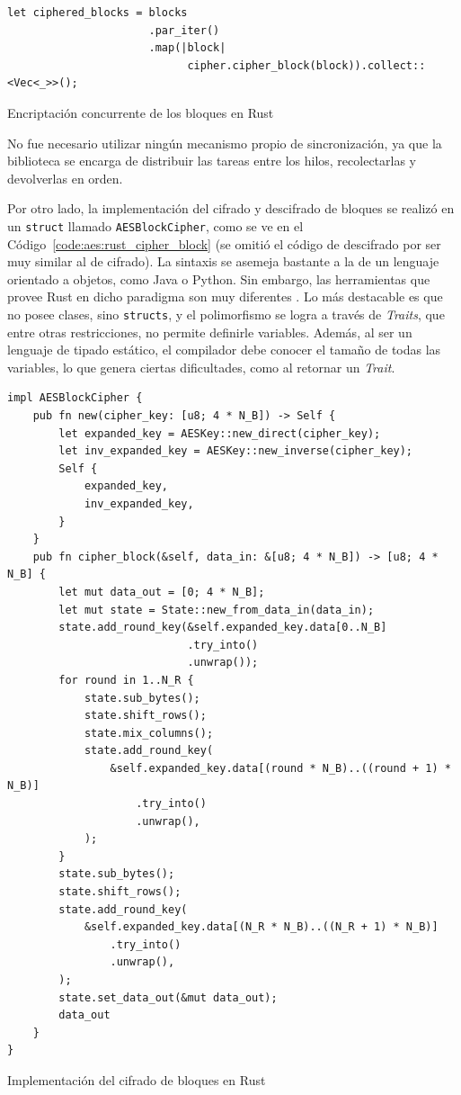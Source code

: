 \documentclass[11pt]{article}
\newcommand{\english}[1]{\textit{#1}}
\begin{document}
\begin{listing}[h]
\begin{verbatim}
let ciphered_blocks = blocks
                      .par_iter()
                      .map(|block|
                            cipher.cipher_block(block)).collect::<Vec<_>>();
\end{verbatim}
\caption{Encriptación concurrente de los bloques en Rust}
\label{code:rust:aes_concurrent}
\end{listing}

No fue necesario utilizar ningún mecanismo propio de sincronización, ya que la biblioteca se encarga de distribuir las tareas entre los hilos, recolectarlas y devolverlas en orden.

Por otro lado, la implementación del cifrado y descifrado de bloques se realizó en un \lstinline{struct} llamado \lstinline{AESBlockCipher}, como se ve en el Código~\ref{code:aes:rust_cipher_block} (se omitió el código de descifrado por ser muy similar al de cifrado). La sintaxis se asemeja bastante a la de un lenguaje orientado a objetos, como Java o Python. Sin embargo, las herramientas que provee Rust en dicho paradigma son muy diferentes \cite{aes:rust_oop}. Lo más destacable es que no posee clases, sino \lstinline{structs}, y el polimorfismo se logra a través de \english{Traits}, que entre otras restricciones, no permite definirle variables. Además, al ser un lenguaje de tipado estático, el compilador debe conocer el tamaño de todas las variables, lo que genera ciertas dificultades, como al retornar un \english{Trait}.

\begin{listing}[h]
\begin{verbatim}
impl AESBlockCipher {
    pub fn new(cipher_key: [u8; 4 * N_B]) -> Self {
        let expanded_key = AESKey::new_direct(cipher_key);
        let inv_expanded_key = AESKey::new_inverse(cipher_key);
        Self {
            expanded_key,
            inv_expanded_key,
        }
    }
    pub fn cipher_block(&self, data_in: &[u8; 4 * N_B]) -> [u8; 4 * N_B] {
        let mut data_out = [0; 4 * N_B];
        let mut state = State::new_from_data_in(data_in);
        state.add_round_key(&self.expanded_key.data[0..N_B]
                            .try_into()
                            .unwrap());
        for round in 1..N_R {
            state.sub_bytes();
            state.shift_rows();
            state.mix_columns();
            state.add_round_key(
                &self.expanded_key.data[(round * N_B)..((round + 1) * N_B)]
                    .try_into()
                    .unwrap(),
            );
        }
        state.sub_bytes();
        state.shift_rows();
        state.add_round_key(
            &self.expanded_key.data[(N_R * N_B)..((N_R + 1) * N_B)]
                .try_into()
                .unwrap(),
        );
        state.set_data_out(&mut data_out);
        data_out
    }
}
\end{verbatim}
\caption{Implementación del cifrado de bloques en Rust}
\label{code:aes:rust_cipher_block}
\end{listing}
\end{document}
